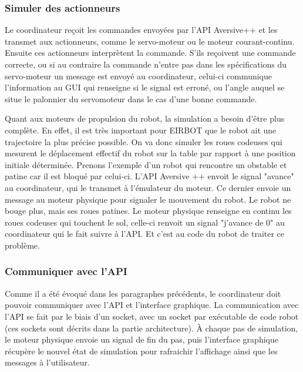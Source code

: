 \subsubsection{Simuler des actionneurs}
Le coordinateur reçoit les commandes envoyées par l'API Aversive++ et les transmet aux actionneurs, comme le servo-moteur ou le moteur courant-continu. Ensuite ces actionneurs interprètent la commande. S'ils reçoivent une commande correcte, ou si au contraire la commande n'entre pas dans les spécifications du servo-moteur un message est envoyé au coordinateur, celui-ci communique l'information au GUI qui renseigne si le signal est erroné, ou l'angle auquel se situe le palonnier du servomoteur dans le cas d'une bonne commande.

Quant aux moteurs de propulsion du robot, la simulation a besoin d'être plus complète. En effet, il est très important pour EIRBOT que le robot ait une trajectoire la plus précise possible.
On va donc simuler les roues codeuses qui mesurent le déplacement effectif du robot sur la table par rapport à une position initiale déterminée.
Prenons l'exemple d'un robot qui rencontre un obstable et patine car il est bloqué par celui-ci. L'API Aversive ++ envoit le signal "avance" au coordinateur, qui le transmet à l'émulateur du moteur. Ce dernier envoie un message au moteur physique pour signaler le mouvement du robot. Le robot ne bouge plus, mais ses roues patines. Le moteur physique renseigne en continu les roues codeuses qui touchent le sol, celle-ci renvoit un signal "j'avance de 0" au coordinateur qui le fait suivre à l'API. Et c'est au code du robot de traiter ce problème.

\subsubsection{Communiquer avec l'API}
Comme il a été évoqué dans les paragraphes précédents, le coordinateur doit pouvoir communiquer avec l'API et l'interface graphique. La communication avec l'API se fait par le biais d'un socket, avec un socket par exécutable de code robot (ces sockets sont décrits dans la partie architecture). À chaque pas de simulation, le moteur physique envoie un signal de fin du pas, puis l'interface graphique récupère le nouvel état de simulation pour rafraichir l'affichage ainsi que les messages à l'utilisateur.
   

